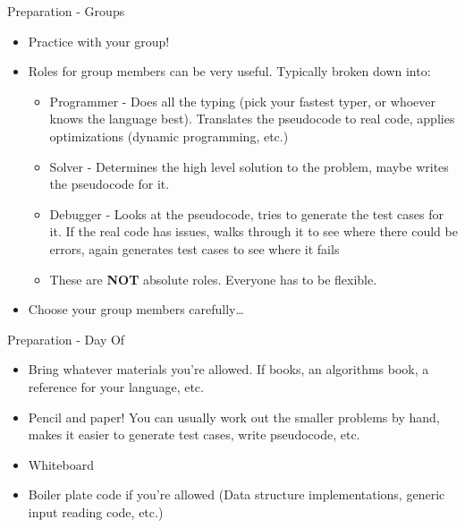 \documentclass{beamer}
\begin{document}
\begin{frame}{Preparation - Groups}
  \begin{centering}
    \begin{itemize}
      \item Practice with your group!
      \item Roles for group members can be very useful. Typically broken down into:
      \begin{itemize}
        \item Programmer - Does all the typing (pick your fastest typer, or whoever knows the language best). Translates the pseudocode to real code, applies optimizations (dynamic programming, etc.)
        \item Solver - Determines the high level solution to the problem, maybe writes the pseudocode for it.
        \item Debugger - Looks at the pseudocode, tries to generate the test cases for it. If the real code has issues, walks through it to see where there could be errors, again generates test cases to see where it fails
          \item These are \textbf{NOT} absolute roles. Everyone has to be flexible.
      \end{itemize}
      \pause
      \item Choose your group members carefully\ldots
    \end{itemize}
  \end{centering}
\end{frame}

\begin{frame}{Preparation - Day Of}
  \begin{centering}
    \begin{itemize}
      \item Bring whatever materials you're allowed. If books, an algorithms book, a reference for your language, etc.
      \item Pencil and paper! You can usually work out the smaller problems by hand, makes it easier to generate test cases, write pseudocode, etc.
      \item Whiteboard
      \item Boiler plate code if you're allowed (Data structure implementations, generic input reading code, etc.)
    \end{itemize}
  \end{centering}
\end{frame}
\end{document}
